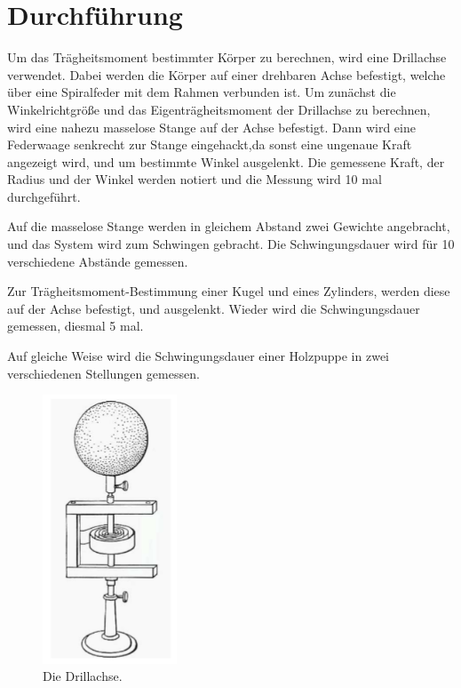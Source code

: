 \section{Durchführung}
\label{sec:Durchführung}

Um das Trägheitsmoment bestimmter Körper zu berechnen, wird eine Drillachse verwendet.
Dabei werden die Körper auf einer drehbaren Achse befestigt, welche über eine Spiralfeder mit dem Rahmen verbunden ist.
Um zunächst die Winkelrichtgröße und das Eigenträgheitsmoment der Drillachse zu berechnen,
wird eine nahezu masselose Stange auf der Achse befestigt. 
Dann wird eine Federwaage senkrecht zur Stange eingehackt,da sonst eine ungenaue Kraft angezeigt wird, und um bestimmte Winkel ausgelenkt.
Die gemessene Kraft, der Radius und der Winkel werden notiert und die Messung wird 10 mal durchgeführt.

Auf die masselose Stange werden in gleichem Abstand zwei Gewichte angebracht, und das System wird zum Schwingen gebracht.
Die Schwingungsdauer wird für 10 verschiedene Abstände gemessen.

Zur Trägheitsmoment-Bestimmung einer Kugel und eines Zylinders, werden diese auf der Achse befestigt, und ausgelenkt.
Wieder wird die Schwingungsdauer gemessen, diesmal 5 mal. 

Auf gleiche Weise wird die Schwingungsdauer einer Holzpuppe in zwei verschiedenen Stellungen gemessen.

\begin{figure}[H]
  \centering
  \includegraphics[height=8cm]{Drillachse.PNG}
  \caption{Die Drillachse.}
  \label{fig:drill}
\end{figure}


